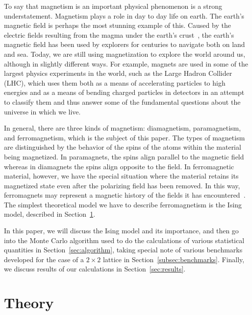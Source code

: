 \documentclass[12pt]{article}
\numberwithin{equation}{section}
\begin{document}
To say that magnetism is an important physical phenomenon is a strong understatement.  Magnetism plays a role in day to day life on earth.  The earth's magnetic field is perhaps the most stunning example of this.  Caused by the electric fields resulting from the magma under the earth's crust~\cite{magma}, the earth's magnetic field has been used by explorers for centuries to navigate both on land and sea.  Today, we are still using magnetization to explore the world around us, although in slightly different ways.  For example, magnets are used in some of the largest physics experiments in the world, such as the Large Hadron Collider (LHC), which uses them both as a means of accelerating particles to high energies and as a means of bending charged particles in detectors in an attempt to classify them and thus answer some of the fundamental questions about the universe in which we live.
\par In general, there are three kinds of magnetism: diamagnetism, paramagnetism, and ferromagnetism, which is the subject of this paper.  The types of magnetism are distinguished by the behavior of the spins of the atoms within the material being magnetized.  In paramagnets, the spins align parallel to the magnetic field whereas in diamagnets the spins align opposite to the field.  In ferromagnetic material, however, we have the special situation where the material retains its magnetized state even after the polarizing field has been removed.  In this way, ferromagnets may represent a magnetic history of the fields it has encountered~\cite{griffiths}.  The simplest theoretical model we have to describe ferromagnetism is the Ising model, described in Section~\ref{sec:theory}.  
\par In this paper, we will discuss the Ising model and its importance, and then go into the Monte Carlo algorithm used to do the calculations of various statistical quantities in Section~\ref{sec:algorithm}, taking special note of various benchmarks developed for the case of a $2\times2$ lattice in Section~\ref{subsec:benchmarks}.  Finally, we discuss results of our calculations in Section~\ref{sec:results}.

\section{Theory}
\label{sec:theory}
\end{document}
